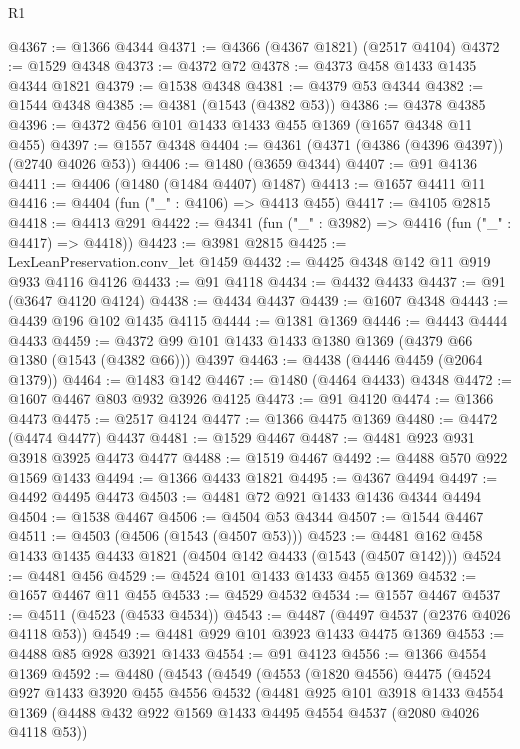 \begin{lexlean}{R1}
\begin{coremodule}
@4367 := @1366 @4344
@4371 := @4366 (@4367 @1821) (@2517 @4104)
@4372 := @1529 @4348
@4373 := @4372 @72
@4378 := @4373 @458 @1433 @1435 @4344 @1821
@4379 := @1538 @4348
@4381 := @4379 @53 @4344
@4382 := @1544 @4348
@4385 := @4381 (@1543 (@4382 @53))
@4386 := @4378 @4385
@4396 := @4372 @456 @101 @1433 @1433 @455 @1369 (@1657 @4348 @11 @455)
@4397 := @1557 @4348
@4404 := @4361 (@4371 (@4386 (@4396 @4397)) (@2740 @4026 @53))
@4406 := @1480 (@3659 @4344)
@4407 := @91 @4136
@4411 := @4406 (@1480 (@1484 @4407) @1487)
@4413 := @1657 @4411 @11
@4416 := @4404 (fun ("_" : @4106) => @4413 @455)
@4417 := @4105 @2815
@4418 := @4413 @291
@4422 := @4341 (fun ("_" : @3982) => @4416 (fun ("_" : @4417) => @4418))
@4423 := @3981 @2815
@4425 := LexLeanPreservation.conv_let @1459
@4432 := @4425 @4348 @142 @11 @919 @933 @4116 @4126
@4433 := @91 @4118
@4434 := @4432 @4433
@4437 := @91 (@3647 @4120 @4124)
@4438 := @4434 @4437
@4439 := @1607 @4348
@4443 := @4439 @196 @102 @1435 @4115
@4444 := @1381 @1369
@4446 := @4443 @4444 @4433
@4459 := @4372 @99 @101 @1433 @1433 @1380 @1369 (@4379 @66 @1380 (@1543 (@4382 @66))) @4397
@4463 := @4438 (@4446 @4459 (@2064 @1379))
@4464 := @1483 @142
@4467 := @1480 (@4464 @4433) @4348
@4472 := @1607 @4467 @803 @932 @3926 @4125
@4473 := @91 @4120
@4474 := @1366 @4473
@4475 := @2517 @4124
@4477 := @1366 @4475 @1369
@4480 := @4472 (@4474 @4477) @4437
@4481 := @1529 @4467
@4487 := @4481 @923 @931 @3918 @3925 @4473 @4477
@4488 := @1519 @4467
@4492 := @4488 @570 @922 @1569 @1433
@4494 := @1366 @4433 @1821
@4495 := @4367 @4494
@4497 := @4492 @4495 @4473
@4503 := @4481 @72 @921 @1433 @1436 @4344 @4494
@4504 := @1538 @4467
@4506 := @4504 @53 @4344
@4507 := @1544 @4467
@4511 := @4503 (@4506 (@1543 (@4507 @53)))
@4523 := @4481 @162 @458 @1433 @1435 @4433 @1821 (@4504 @142 @4433 (@1543 (@4507 @142)))
@4524 := @4481 @456
@4529 := @4524 @101 @1433 @1433 @455 @1369
@4532 := @1657 @4467 @11 @455
@4533 := @4529 @4532
@4534 := @1557 @4467
@4537 := @4511 (@4523 (@4533 @4534))
@4543 := @4487 (@4497 @4537 (@2376 @4026 @4118 @53))
@4549 := @4481 @929 @101 @3923 @1433 @4475 @1369
@4553 := @4488 @85 @928 @3921 @1433
@4554 := @91 @4123
@4556 := @1366 @4554 @1369
@4592 := @4480
    (@4543
      (@4549
        (@4553
          (@1820 @4556)
          @4475
          (@4524
            @927
            @1433
            @3920
            @455
            @4556
            @4532
            (@4481
              @925
              @101
              @3918
              @1433
              @4554
              @1369
              (@4488 @432 @922 @1569 @1433 @4495 @4554 @4537 (@2080 @4026 @4118 @53))

\end{coremodule}
\end{lexlean}
